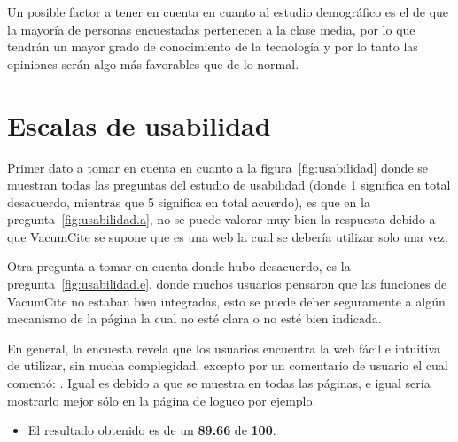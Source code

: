 \documentclass[11pt]{report}
\begin{document}
\par
Un posible factor a tener en cuenta en cuanto al estudio demográfico es el de que la mayoría de personas encuestadas
pertenecen a la clase media, por lo que tendrán un mayor grado de conocimiento de la tecnología y por lo tanto las
opiniones serán algo más favorables que de lo normal.

\section{Escalas de usabilidad}

\par
Primer dato a tomar en cuenta en cuanto a la figura~\ref{fig:usabilidad} donde se muestran todas las preguntas del
estudio de usabilidad (donde 1 significa en total desacuerdo, mientras que 5 significa en total acuerdo), es que en la
pregunta~\ref{fig:usabilidad.a}, no se puede valorar muy bien la respuesta debido a que VacumCite se supone que es una
web la cual se debería utilizar solo una vez.
\par
Otra pregunta a tomar en cuenta donde hubo desacuerdo, es la pregunta~\ref{fig:usabilidad.e}, donde muchos usuarios
pensaron que las funciones de VacumCite no estaban bien integradas, esto se puede deber seguramente a algún mecanismo de
la página la cual no esté clara o no esté bien indicada.
\par
En general, la encuesta revela que los usuarios encuentra la web fácil e intuitiva de utilizar, sin mucha complegidad,
excepto por un comentario de usuario el cual comentó:
. Igual es debido a que se muestra en todas las
páginas, e igual sería mostrarlo mejor sólo en la página de logueo por ejemplo.
\par
\begin{itemize}
	\item El resultado obtenido es de un \textbf{89.66} de \textbf{100}.
\end{itemize}
\end{document}

